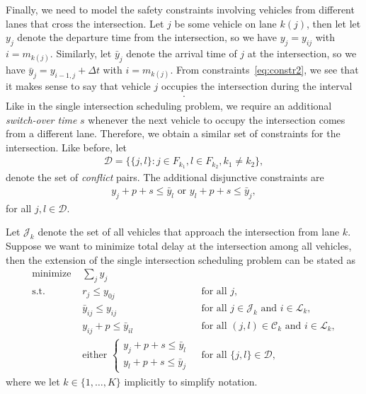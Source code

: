 \documentclass{article}
\theoremstyle{definition}
\theoremstyle{plain}
\begin{document}
Finally, we need to model the safety constraints involving vehicles from
different lanes that cross the intersection. Let $j$ be some vehicle on lane
$k(j)$, then let let $y_{j}$ denote the departure time from the intersection, so
we have $y_{j} = y_{ij}$ with $i=m_{k(j)}$. Similarly, let $\bar{y}_{j}$ denote
the arrival time of $j$ at the intersection, so we have
$\bar{y}_{j} = y_{i-1,j} + \Delta t$ with $i = m_{k(j)}$. From
constraints~\eqref{eq:constr2}, we see that it makes sense to say that vehicle
$j$ occupies the intersection during the interval
\begin{align}
  [\bar{y}_{j}, y_{j} + p] .
\end{align}
Like in the single intersection scheduling problem, we require an additional
\textit{switch-over time} $s$ whenever the next vehicle to occupy the
intersection comes from a different lane. Therefore, we obtain a similar set of
constraints for the intersection. Like before, let
\begin{align}
  \mathcal{D} = \{ \{j, l\} : j \in F_{k_{1}}, l \in F_{k_{2}} , k_{1} \neq k_{2} \} ,
\end{align}
denote the set of \textit{conflict} pairs. The additional disjunctive
constraints are
\begin{align}
  \label{eq:3}
  y_{j} + p + s \leq \bar{y}_{l} \text{ or } y_{l} + p + s \leq \bar{y}_{j} ,
\end{align}
for all $j, l \in \mathcal{D}$.

Let $\mathcal{J}_{k}$ denote the set of all vehicles that approach the
intersection from lane $k$. Suppose we want to minimize total delay at the
intersection among all vehicles, then the extension of the single intersection
scheduling problem can be stated as
\begin{subequations}
\begin{align}
  \label{eq:finite-buffer-problem}
  \text{minimize } & \sum_{j} y_{j} \\
  \text{s.t. } & r_{j} \leq y_{0j} & \text{ for all } j, \\
               & \bar{y}_{ij} \leq y_{ij} & \text{ for all } j \in \mathcal{J}_{k} \text{ and } i \in \mathcal{L}_{k}, \\
               & y_{ij} + p \leq \bar{y}_{il} & \text{ for all } (j,l) \in \mathcal{C}_{k} \text{ and } i \in \mathcal{L}_{k}, \\
               & \text{either } \begin{cases} y_{j} + p + s \leq \bar{y}_{l} \\ y_{l} + p + s \leq \bar{y}_{j} \end{cases} & \text{ for all } \{j,l\} \in \mathcal{D} ,
\end{align}
\end{subequations}
where we let $k \in \{1, \dots, K\}$ implicitly to simplify notation.
\end{document}
